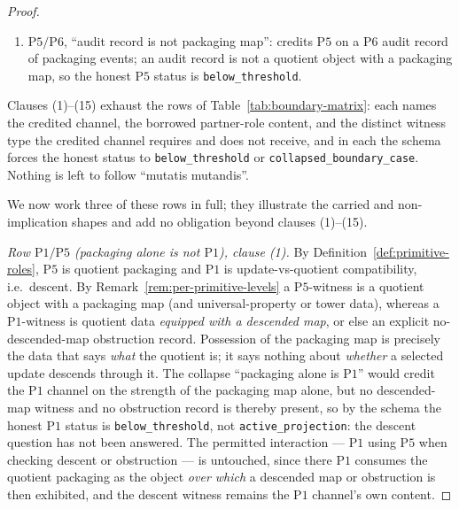 \documentclass[11pt]{article}
\theoremstyle{definition}
\newcommand{\activeproj}{\texttt{active\_projection}}
\newcommand{\belowthr}{\texttt{below\_threshold}}
\newcommand{\collapsedbc}{\texttt{collapsed\_boundary\_case}}
\newcommand{\Pone}{\ensuremath{\mathrm{P1}}}
\newcommand{\Pfour}{\ensuremath{\mathrm{P4}}}
\newcommand{\Pfive}{\ensuremath{\mathrm{P5}}}
\newcommand{\Psix}{\ensuremath{\mathrm{P6}}}
\begin{document}
\begin{proof}
\begin{enumerate}[topsep=2pt,itemsep=2pt,label=\textup{(\arabic*)}]
    on a \Psix{} audit record of staged histories; an audit record is not an
    order/transition/refinement certificate, so the honest \Pfour{} status is
    \belowthr{}.
  \item \(\Pfive{}/\Psix{}\), ``audit record is not packaging map'': credits
    \Pfive{} on a \Psix{} audit record of packaging events; an audit record is
    not a quotient object with a packaging map, so the honest \Pfive{} status is
    \belowthr{}.
\end{enumerate}
Clauses (1)--(15) exhaust the rows of Table~\ref{tab:boundary-matrix}: each
names the credited channel, the borrowed partner-role content, and the
distinct witness type the credited channel requires and does not receive, and
in each the schema forces the honest status to \belowthr{} or \collapsedbc{}.
Nothing is left to follow ``mutatis mutandis''.

We now work three of these rows in full; they illustrate the carried and
non-implication shapes and add no obligation beyond clauses (1)--(15).

\emph{Row \(\Pone{}/\Pfive{}\) (packaging alone is not \(\Pone{}\)), clause
(1).} By Definition~\ref{def:primitive-roles}, \Pfive{} is quotient packaging
and \Pone{} is update-vs-quotient compatibility, i.e.\ descent. By
Remark~\ref{rem:per-primitive-levels} a \Pfive{}-witness is a quotient object
with a packaging map (and universal-property or tower data), whereas a
\Pone{}-witness is quotient data \emph{equipped with a descended map}, or else
an explicit no-descended-map obstruction record. Possession of the packaging
map is precisely the data that says \emph{what} the quotient is; it says nothing
about \emph{whether} a selected update descends through it. The collapse
``packaging alone is \Pone{}'' would credit the \Pone{} channel on the strength
of the packaging map alone, but no descended-map witness and no obstruction
record is thereby present, so by the schema the honest \Pone{} status is
\belowthr{}, not \activeproj{}: the descent question has not been answered. The
permitted interaction --- \Pone{} using \Pfive{} when checking descent or
obstruction --- is untouched, since there \Pone{} consumes the quotient
packaging as the object \emph{over which} a descended map or obstruction is then
exhibited, and the descent witness remains the \Pone{} channel's own content.


\end{proof}
\end{document}

